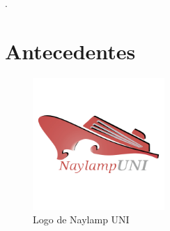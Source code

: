 \documentclass[11pt,letterpaper,twocolumn]{article}
\begin{document}
\lipsum[1-2].\par 
 
\begin{table}[H]
	\begin{center}
	\end{center}
	\label{tab:resumen}
	\caption{Valores de distancias y diámetros respectivos}
\end{table}
\lipsum[1-2]

\section{Antecedentes}
\lipsum[3]

\begin{figure}[ht]
    \centering
    \includegraphics[width=5cm]{figuras/NU_Logo.png} 
    \caption{Logo de Naylamp UNI}
    \label{fig:logo_w}
\end{figure}
\end{document}
